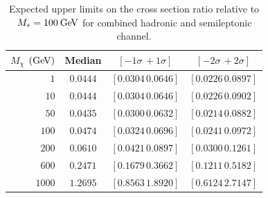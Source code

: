 \begin{table}[!ht]
\centering
\begin{tabular}{|r|c|c|c|}
\hline
  $M_\chi$ $(\mathrm{Ge\kern -0.1em V})$ & Median & $\left[-1\sigma\, +1\sigma\right]$ & $\left[-2\sigma\, +2\sigma\right]$ \\
\hline
  $1$               & $0.0444$ & $\left[0.0304\, 0.0646\right]$ & $\left[0.0226\, 0.0897\right]$ \\
  $10$              & $0.0444$ & $\left[0.0304\, 0.0646\right]$ & $\left[0.0226\, 0.0902\right]$ \\
  $50$              & $0.0435$ & $\left[0.0300\, 0.0632\right]$ & $\left[0.0214\, 0.0882\right]$ \\
  $100$             & $0.0474$ & $\left[0.0324\, 0.0696\right]$ & $\left[0.0241\, 0.0972\right]$ \\
  $200$             & $0.0610$ & $\left[0.0421\, 0.0897\right]$ & $\left[0.0300\, 0.1261\right]$ \\
  $600$             & $0.2471$ & $\left[0.1679\, 0.3662\right]$ & $\left[0.1211\, 0.5182\right]$ \\
  $1000$            & $1.2695$ & $\left[0.8563\, 1.8920\right]$ & $\left[0.6124\, 2.7147\right]$ \\
\hline
\end{tabular}
\caption{Expected upper limits on the cross section ratio relative to $M_*=100\:\mathrm{Ge\kern -0.1em V}$ for combined hadronic and semileptonic channel.}
\label{tab:rLimits_comboshape}
\end{table}

